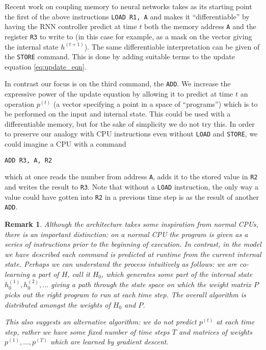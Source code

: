 \documentclass[english,letter paper,12pt,leqno]{article}
\theoremstyle{example}
\newtheorem{remark}[theorem]{Remark}
\numberwithin{equation}{section}
\begin{document}
Recent work \cite{??,??} on coupling memory to neural networks takes as its starting point the first of the above instructions \verb+LOAD R1, A+ and makes it ``differentiable'' by having the RNN controller predict at time $t$ both the memory address \verb+A+ and the register \verb+R3+ to write to (in this case for example, as a mask on the vector giving the internal state $h^{(t+1)}$). The same differentiable interpretation can be given of the \verb+STORE+ command. This is done by adding suitable terms to the update equation \eqref{eq:update_eqn}.

In contrast our focus is on the third command, the \verb+ADD+. We increase the expressive power of the update equation by allowing it to predict at time $t$ an operation $p^{(t)}$ (a vector specifying a point in a space of ``programs'') which is to be performed on the input and internal state. This could be used with a differentiable memory, but for the sake of simplicity we do not try this. In order to preserve our analogy with CPU instructions even without \verb+LOAD+ and \verb+STORE+, we could imagine a CPU with a command
\begin{verbatim}
ADD R3, A, R2
\end{verbatim}
which at once reads the number from address \verb+A+, adds it to the stored value in \verb+R2+ and writes the result to \verb+R3+. Note that without a \verb+LOAD+ instruction, the only way a value could have gotten into \verb+R2+ in a previous time step is as the result of another \verb+ADD+.

\begin{remark} Although the architecture takes some inspiration from normal CPUs, there is an important distinction: on a normal CPU the program is given as a series of instructions prior to the beginning of execution. In contrast, in the model we have described each command is \emph{predicted} at runtime from the current internal state. Perhaps we can understand the process intuitively as follows: we are co-learning a part of $H$, call it $H_0$, which generates some part of the internal state $h^{(1)}_{0}, h^{(2)}_{0}, \ldots$ giving a path through the state space on which the weight matrix $P$ picks out the right program to run at each time step. The overall algorithm is distributed amongst the weights of $H_0$ and $P$.

This also suggests an alternative algorithm: we do not predict $p^{(t)}$ at each time step, rather we have some fixed number of time steps $T$ and matrices of weights $p^{(1)}, \ldots, p^{(T)}$ which are learned by gradient descent.
\end{remark}
\end{document}
